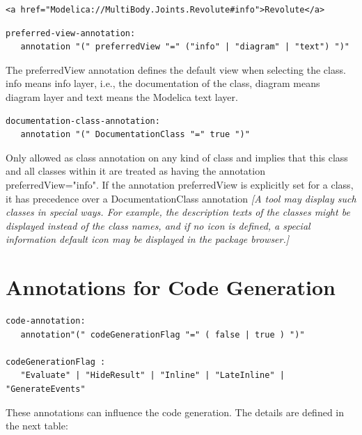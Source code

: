 \documentclass[10pt,a4paper]{report}
\def\doublelabel#1{\label{#1}}
\begin{document}
\begin{lstlisting}[language=modelica]
<a href="Modelica://MultiBody.Joints.Revolute#info">Revolute</a>
\end{lstlisting}
\begin{lstlisting}[language=grammar]
preferred-view-annotation:
   annotation "(" preferredView "=" ("info" | "diagram" | "text") ")"
\end{lstlisting}

The preferredView annotation defines the default view when selecting the
class. info means info layer, i.e., the documentation of the class,
diagram means diagram layer and text means the Modelica text layer.
\begin{lstlisting}[language=grammar]
documentation-class-annotation:
   annotation "(" DocumentationClass "=" true ")"
\end{lstlisting}

Only allowed as class annotation on any kind of class and implies that
this class and all classes within it are treated as having the
annotation preferredView="info". If the annotation preferredView is
explicitly set for a class, it has precedence over a DocumentationClass
annotation \emph{{[}A tool may display such classes in special ways. For
example, the description texts of the classes might be displayed instead
of the class names, and if no icon is defined, a special information
default icon may be displayed in the package browser.{]}}

\section{Annotations for Code Generation}\doublelabel{annotations-for-code-generation}
\begin{lstlisting}[language=grammar]
code-annotation:
   annotation"(" codeGenerationFlag "=" ( false | true ) ")"

codeGenerationFlag :
   "Evaluate" | "HideResult" | "Inline" | "LateInline" | "GenerateEvents"
\end{lstlisting}
These annotations can influence the code generation. The details are
defined in the next table:
\end{document}
